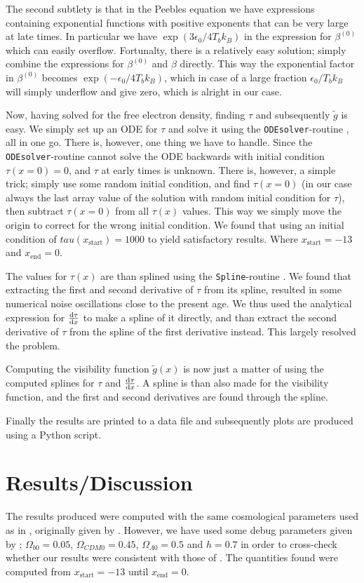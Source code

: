 \documentclass[twocolumn]{aastex62}
\begin{document}
The second subtlety is that in the Peebles equation we have expressions containing exponential functions with positive exponents that can be very large at late times. In particular we have $\exp\left(3\epsilon_0 / 4T_b k_B\right)$ in the expression for $\beta^{(0)}$ which can easily overflow. Fortunalty, there is a relatively easy solution; simply combine the expressions for $\beta^{(0)}$ and $\beta$ directly. This way the exponential factor in $\beta^{(0)}$ becomes $\exp\left(-\epsilon_0 / 4T_b k_B\right)$, which in case of a large fraction $\epsilon_0 / T_b k_B$ will simply underflow and give zero, which is alright in our case.

Now, having solved for the free electron density, finding $\tau$ and subsequently $\tilde{g}$ is easy. We simply set up an ODE for $\tau$ and solve it using the \texttt{ODEsolver}-routine \citep[]{winther:2020}, all in one go. There is, however, one thing we have to handle. Since the \texttt{ODEsolver}-routine cannot solve the ODE backwards with initial condition $\tau(x = 0) = 0$, and $\tau$ at early times is unknown. There is, however, a simple trick; simply use some random initial condition, and find $\tau(x=0)$ (in our case always the last array value of the solution with random initial condition for $\tau$), then subtract $\tau(x = 0)$ from all $\tau(x)$ values. This way we simply move the origin to correct for the wrong initial condition. We found that using an initial condition of $tau(x_\text{start}) = 1000$ to yield satisfactory results. Where $x_\text{start} = -13$ and $x_\text{end} = 0$. 

The values for $\tau(x)$ are than splined using the \texttt{Spline}-routine \citep[]{winther:2020}. We found that extracting the first and second derivative of $\tau$ from its spline, resulted in some numerical noise oscillations close to the present age. We thus used the analytical expression for $\dv{\tau}{x}$ to make a spline of it directly, and than extract the second derivative of $\tau$ from the spline of the first derivative instead. This largely resolved the problem. 

Computing the visibility function $\tilde{g}(x)$ is now just a matter of using the computed splines for $\tau$ and $\dv{\tau}{x}$. A spline is than also made for the visibility function, and the first and second derivatives are found through the spline. 

Finally the results are printed to a data file and subsequently plots are produced using a Python script.


\section{Results/Discussion}\label{sec:Results}
The results produced were computed with the same cosmological parameters used as in \cite{stutzer:2020}, originally given by \cite{callin:2006}. However, we have used some debug parameters given by \cite{winther:2020}; $\Omega_{b0} = 0.05$, $\Omega_{CDM0} = 0.45$, $\Omega_{\Lambda 0} = 0.5$ and $h = 0.7$ in order to cross-check whether our results were consistent with those of \cite{winther:2020}. The quantities found were computed from $x_\text{start} = -13$ until $x_\text{end} = 0$.
\end{document}
